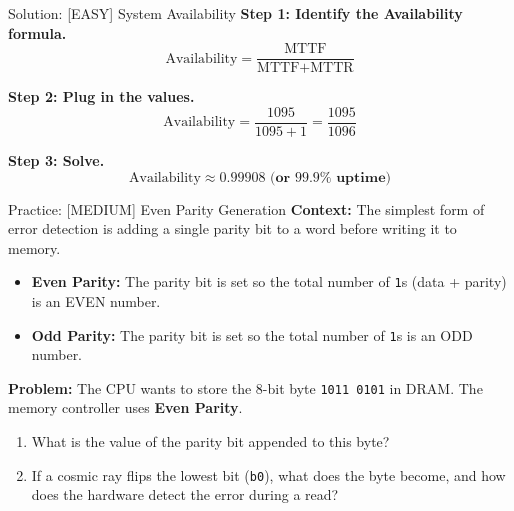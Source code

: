 \documentclass[aspectratio=169]{beamer}
\begin{document}
\begin{frame}{Solution: [EASY] System Availability}
\textbf{Step 1: Identify the Availability formula.}
\[ \text{Availability} = \frac{\text{MTTF}}{\text{MTTF} + \text{MTTR}} \]

\vspace{0.5cm}
\textbf{Step 2: Plug in the values.}
\[ \text{Availability} = \frac{1095}{1095 + 1} = \frac{1095}{1096} \]

\vspace{0.5cm}
\textbf{Step 3: Solve.}
\[ \text{Availability} \approx \mathbf{0.99908 \text{ (or } 99.9\% \text{ uptime)}} \]
\end{frame}

\begin{frame}{Practice: [MEDIUM] Even Parity Generation}
\textbf{Context:} The simplest form of error detection is adding a single parity bit to a word before writing it to memory. 
\begin{itemize}
    \item \textbf{Even Parity:} The parity bit is set so the total number of \texttt{1}s (data + parity) is an EVEN number.
    \item \textbf{Odd Parity:} The parity bit is set so the total number of \texttt{1}s is an ODD number.
\end{itemize}

\vspace{0.3cm}
\textbf{Problem:} 
The CPU wants to store the 8-bit byte \texttt{1011 0101} in DRAM. The memory controller uses \textbf{Even Parity}. 
\begin{enumerate}
    \item What is the value of the parity bit appended to this byte?
    \item If a cosmic ray flips the lowest bit (\texttt{b0}), what does the byte become, and how does the hardware detect the error during a read?
\end{enumerate}
\end{frame}
\end{document}
